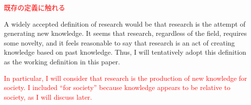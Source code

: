 \textcolor{red}{
既存の定義に触れる
}

A widely accepted definition of research would be that research is the attempt of generating new knowledge. It seems that research, regardless of the field, requires some novelty, and it feels reasonable to say that research is an act of creating knowledge based on past knowledge. Thus, I will tentatively adopt this definition as the working definition in this paper. 

\textcolor{red}{
In particular, I will consider that research is the production of new knowledge for society. I included ``for society'' because knowledge appears to be relative to society, as I will discuss later. 
}






